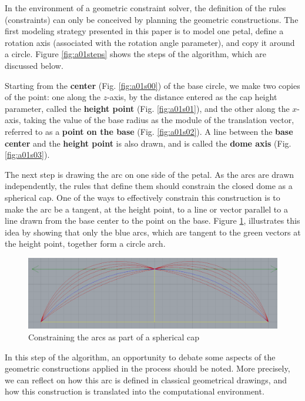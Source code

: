 \documentclass[preprint,12pt,3p]{elsarticle}
\begin{document}
In the environment of a geometric constraint solver, the definition of the rules (constraints) can only be conceived by planning the geometric constructions. The first modeling strategy presented in this paper is to model one petal, define a rotation axis (associated with the rotation angle parameter), and copy it around a circle. Figure \ref{fig:a01steps} shows the steps of the algorithm, which are discussed below.

Starting from the \textbf{center} (Fig. \ref{fig:a01s00}) of the base circle, we make two copies of the point: one along the $z$-axis, by the distance entered as the cap height parameter, called the \textbf{height point} (Fig. \ref{fig:a01s01}), and the other along the $x$-axis, taking the value of the base radius as the module of the translation vector, referred to as a \textbf{point on the base} (Fig. \ref{fig:a01s02}). A line between the \textbf{base center} and the \textbf{height point} is also drawn, and is called the \textbf{dome axis} (Fig. \ref{fig:a01s03}).

The next step is drawing the arc on one side of the petal. As the arcs are drawn independently, the rules that define them should constrain the closed dome as a spherical cap. One of the ways to effectively constrain this construction is to make the arc be a tangent, at the height point, to a line or vector parallel to a line drawn from the base center to the point on the base. Figure \ref{figura:tangente}, illustrates this idea by showing that only the blue arcs, which are tangent to the green vectors at the height point, together form a circle arch.


\begin{figure}[!h]
\begin{center}
\includegraphics[width=0.65
\textwidth]{tangentes.png}
\caption{Constraining the arcs as part of a spherical cap}
\label{figura:tangente}
\end{center}
\end{figure}

In this step of the algorithm, an opportunity to debate some aspects of the geometric constructions applied in the process should be noted. More precisely, we can reflect on how this arc is defined in classical geometrical drawings, and how this construction is translated into the computational environment. 
\end{document}
